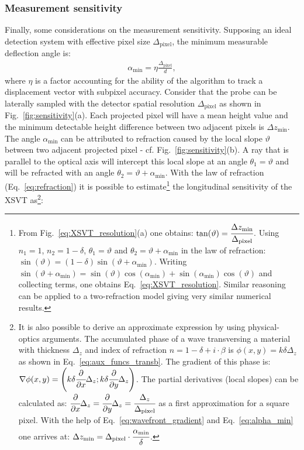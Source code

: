 \begin{refsection}
\clearpage


\subsubsection*{Measurement sensitivity}

Finally, some considerations on the measurement sensitivity. Supposing an ideal detection system with effective pixel size $\Delta_\text{pixel}$, the minimum measurable deflection angle is:
\begin{align}\label{eq:alpha_min}
    \alpha_\text{min}=\eta\frac{\Delta_\text{pixel}}{d},
\end{align}
where $\eta$ is a factor accounting for the ability of the algorithm to track a displacement vector with subpixel accuracy. Consider that the probe can be laterally sampled with the detector spatial resolution $\Delta_\text{pixel}$ as shown in Fig.~\ref{fig:sensitivity}(a). Each projected pixel will have a mean height value and the minimum detectable height difference between two adjacent pixels is $\Delta{z_{\text{min}}}$. The angle $\alpha_\text{min}$ can be attributed to refraction caused by the local slope $\vartheta$ between two adjacent projected pixel - cf. Fig.~\ref{fig:sensitivity}(b). A ray that is parallel to the optical axis will intercept this local slope at an angle $\theta_1=\vartheta$ and will be refracted with an angle $\theta_2=\vartheta+\alpha_\text{min}$. With the law of refraction (Eq.~\ref{eq:refraction}) it is possible to estimate\footnote{From Fig.~\ref{eq:XSVT_resolution}(a) one obtains: $\tan(\vartheta)=\cfrac{\Delta{z_{\text{min}}}}{\Delta_\text{pixel}}$. Using $n_1=1$, $n_2=1-\delta$, $\theta_1=\vartheta$ and  $\theta_2=\vartheta+\alpha_\text{min}$ in the law of refraction: $\sin(\vartheta)=(1-\delta)\sin(\vartheta+\alpha_\text{min})$. Writing $\sin(\vartheta+\alpha_\text{min})=\sin(\vartheta)\cos(\alpha_\text{min})+\sin(\alpha_\text{min})\cos(\vartheta)$ and collecting terms, one obtains Eq.~\ref{eq:XSVT_resolution}. Similar reasoning can be applied to a two-refraction model giving very similar numerical results.} the longitudinal sensitivity of the XSVT as\footnote{It is also possible to derive an approximate expression by using physical-optics arguments. The accumulated phase of a wave transversing a material with thickness $\Delta_z$ and index of refraction $n=1-\delta+i\cdot\beta$ is $\phi(x,y)=k\delta\Delta_z$ as shown in Eq.~\ref{eq:aux_funcs_transb}. The gradient of this phase is: $\nabla \phi(x,y)=\Bigg(k\delta\cfrac{\partial}{\partial x}\Delta_z; k\delta\cfrac{\partial}{\partial y}\Delta_z\Bigg)$. The partial derivatives (local slopes) can be calculated as: $\cfrac{\partial}{\partial x}\Delta_z = \cfrac{\partial}{\partial y}\Delta_z = \cfrac{\Delta_z}{ \Delta_\text{pixel}}$ as a first approximation for a square pixel. With the help of Eq.~\ref{eq:wavefront_gradient} and Eq.~\ref{eq:alpha_min} one arrives at: $\Delta{z_{\text{min}}}=\Delta_\text{pixel}\cdot\cfrac{\alpha_\text{min}}{\delta}$.}: 

\end{refsection}
